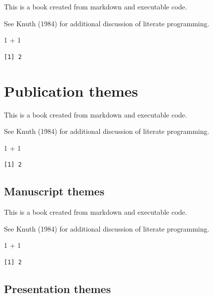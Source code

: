 \documentclass[
  letterpaper,
  DIV=11,
  numbers=noendperiod]{scrreprt}
\newenvironment{Shaded}{\begin{snugshade}}{\end{snugshade}}
\newcommand{\DecValTok}[1]{\textcolor[rgb]{0.68,0.00,0.00}{#1}}
\newcommand{\SpecialCharTok}[1]{\textcolor[rgb]{0.37,0.37,0.37}{#1}}
\begin{document}
This is a book created from markdown and executable code.

See Knuth (1984) for additional discussion of literate programming.

\begin{Shaded}
\begin{Highlighting}[]
\DecValTok{1} \SpecialCharTok{+} \DecValTok{1}
\end{Highlighting}
\end{Shaded}

\begin{verbatim}
[1] 2
\end{verbatim}

\part{Publication themes}

This is a book created from markdown and executable code.

See Knuth (1984) for additional discussion of literate programming.

\begin{Shaded}
\begin{Highlighting}[]
\DecValTok{1} \SpecialCharTok{+} \DecValTok{1}
\end{Highlighting}
\end{Shaded}

\begin{verbatim}
[1] 2
\end{verbatim}

\chapter{Manuscript themes}\label{manuscript-themes}

This is a book created from markdown and executable code.

See Knuth (1984) for additional discussion of literate programming.

\begin{Shaded}
\begin{Highlighting}[]
\DecValTok{1} \SpecialCharTok{+} \DecValTok{1}
\end{Highlighting}
\end{Shaded}

\begin{verbatim}
[1] 2
\end{verbatim}

\chapter{Presentation themes}\label{presentation-themes}
\end{document}
